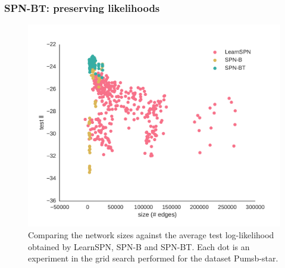 \documentclass[xcolor={usenames,dvipsnames,svgnames}, compress]{beamer}
\begin{document}
\begin{frame}
  \frametitle{SPN-BT: preserving likelihoods}

  \begin{figure}[htbp]
    \begin{center}
      \includegraphics[width=0.7\linewidth]{figures/ll-depth/10-8/pumsb-star-ll-depth}
      \caption{Comparing the network sizes against
        the average test log-likelihood obtained by \textsf{LearnSPN},
        \textsf{SPN-B} and \textsf{SPN-BT}. Each dot is an experiment
        in the grid search performed for the dataset Pumsb-star.}
    \end{center}
  \end{figure}

\end{frame}
\end{document}
